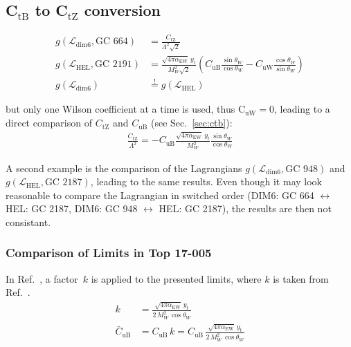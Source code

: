 \documentclass[letterpaper,11pt]{article}
\begin{document}
\subsection{C$_\text{tB}$ to C$_\text{tZ}$ conversion}

\begin{align}
	g(\mathcal{L}_\text{dim6}, \text{GC 664}) &= \frac{C_\text{tZ}}{\Lambda^2\sqrt{2}}\\
	g(\mathcal{L}_\text{HEL}, \text{GC 2191}) &= \frac{\sqrt{4\pi\alpha_\text{EW}}\,y_t}{M_W^2\sqrt{2}} \left(C_\text{uB}\frac{\sin\theta_W}{\cos\theta_W} - C_\text{uW}\frac{\cos\theta_W}{\sin\theta_W}\right)\\
	g(\mathcal{L}_\text{dim6}) &\stackrel{!}{=} g(\mathcal{L}_\text{HEL})
\end{align}

\noindent
but only one Wilson coefficient at a time is used, thus C$_\text{uW}=0$, leading to a direct comparison of $C_\text{tZ}$ and $C_\text{uB}$ (see Sec.~\ref{sec:ctb}):
\begin{align}
	\frac{C_\text{tZ}}{\Lambda^2} = -C_\text{uB}\frac{\sqrt{4\pi\alpha_\text{EW}}\,y_t}{M_W^2}\frac{\sin\theta_W}{\cos\theta_W}
\end{align}

\noindent
A second example is the comparison of the Lagrangians $g(\mathcal{L}_\text{dim6}, \text{GC 948})$ and $g(\mathcal{L}_\text{HEL}, \text{GC 2187})$, leading to the same results.
Even though it may look reasonable to compare the Lagrangian in switched order (DIM6: GC 664 $\leftrightarrow$ HEL: GC 2187, DIM6: GC 948 $\leftrightarrow$ HEL: GC 2187), the results are then not consistant.

\subsubsection{Comparison of Limits in Top 17-005}

In Ref.~\cite{Sirunyan:2017uzs}, a factor~$k$ is applied to the presented limits, where $k$ is taken from Ref.~\cite{annawoodardgithub}. %
\begin{align}
k &= \frac{\sqrt{4\pi\alpha_\text{EW}}\,y_t}{2\,M_W^2\,\cos\theta_W}\\
\bar{C}_\text{uB} &= C_\text{uB}\,k = C_\text{uB}\,\frac{\sqrt{4\pi\alpha_\text{EW}}\,y_t}{2\,M_W^2\,\cos\theta_W}
\end{align}
\end{document}
